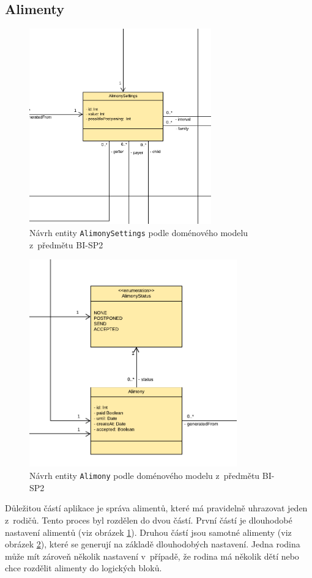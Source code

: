     \subsection{Alimenty}
        \begin{figure}\centering
	        \includegraphics[width=0.7\textwidth]{pdfs/AlimonySettings1}
	        \caption[Návrh entity \texttt{AlimonySettings}]{Návrh entity \texttt{AlimonySettings} podle doménového modelu z~předmětu BI-SP2}\label{image:AlimonySettings1}
        \end{figure}
        \begin{figure}\centering
	        \includegraphics[width=0.8\textwidth]{pdfs/Alimony1}
	        \caption[Návrh entity \texttt{Alimony}]{Návrh entity \texttt{Alimony} podle doménového modelu z~předmětu BI-SP2}\label{image:Alimony1}
        \end{figure}
        Důležitou částí aplikace je správa alimentů, které má pravidelně uhrazovat jeden z~rodičů. Tento proces byl rozdělen do dvou částí. První částí je dlouhodobé nastavení alimentů (viz obrázek \ref{image:AlimonySettings1}). Druhou částí jsou samotné alimenty (viz obrázek \ref{image:Alimony1}), které se generují na základě dlouhodobých nastavení. Jedna rodina může mít zároveň několik nastavení v~případě, že rodina má několik dětí nebo chce rozdělit alimenty do logických bloků.
        
